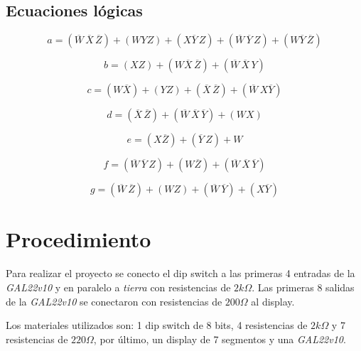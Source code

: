 \documentclass[12pt, oneside, openany]{article}
\begin{document}
\newpage
\subsection{Ecuaciones lógicas}

\begin{equation*}
    a = (\overline{W}\,\overline{X}\,\overline{Z})+(WYZ)+(X\overline{Y}\,Z)+(\overline{W}\,\overline{Y}\,Z)+(W\overline{Y}\,\overline{Z})
\end{equation*}

\begin{equation*}
    b = (XZ)+(W\overline{X}\,\overline{Z})+(\overline{W}\,\overline{X}\,Y)
\end{equation*}

\begin{equation*}
    c = (W\overline{X})+(YZ)+(\overline{X}\,\overline{Z})+(\overline{W}\,X\overline{Y})
\end{equation*}

\begin{equation*}
    d = (\overline{X}\,\overline{Z})+(\overline{W}\,\overline{X}\,\overline{Y})+(WX)
\end{equation*}

\begin{equation*}
    e = (X\overline{Z})+(\overline{Y}\,Z)+W
\end{equation*}

\begin{equation*}
    f = (\overline{W}\,\overline{Y}\,Z)+(W\overline{Z})+(\overline{W}\,\overline{X}\,\overline{Y})
\end{equation*}

\begin{equation*}
    g = (\overline{W}\,\overline{Z})+(WZ)+(\overline{W}\,\overline{Y})+(X\overline{Y})
\end{equation*}

\section{Procedimiento}
{\sffamily\large
    \hspace{0.5cm} Para realizar el proyecto se conecto el dip switch a las primeras 4 entradas de la \emph{GAL22v10} y en paralelo a \emph{tierra} con resistencias de $2k\Omega$. Las primeras 8 salidas de la \emph{GAL22v10} se conectaron con resistencias de $200\Omega$ al display.
    
    \hspace{0.5cm} Los materiales utilizados son: 1 dip switch de 8 bits, 4 resistencias de $2k\Omega$ y 7 resistencias de $220\Omega$, por último, un display de 7 segmentos y una \emph{GAL22v10}.
    
}
\end{document}
